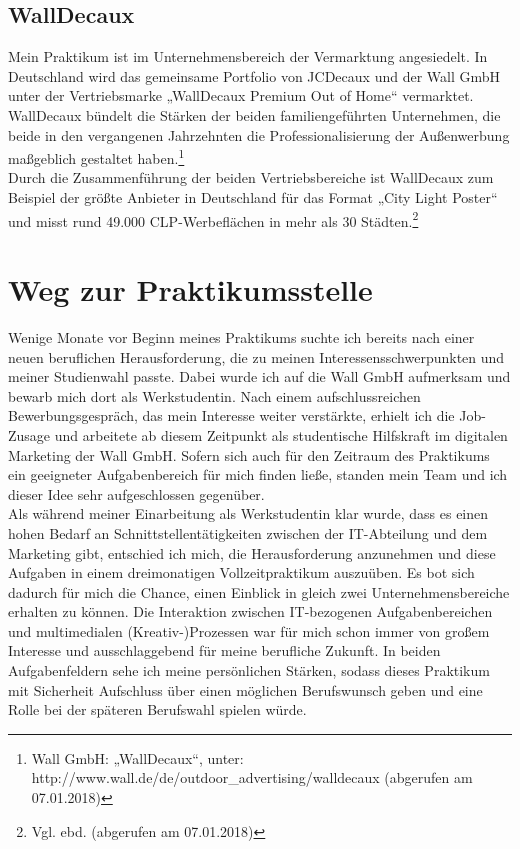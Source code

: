 \subsection{WallDecaux}\label{sec:walldecaux}
Mein Praktikum ist im Unternehmensbereich der Vermarktung angesiedelt. In Deutschland wird das gemeinsame Portfolio von JCDecaux und der Wall GmbH unter der Vertriebsmarke „WallDecaux Premium Out of Home“ vermarktet. WallDecaux bündelt die Stärken der beiden familiengeführten Unternehmen, die beide in den vergangenen Jahrzehnten die Professionalisierung der Außenwerbung maßgeblich gestaltet haben.\footnote{\label{foot:8}Wall GmbH: „WallDecaux“, unter: http://www.wall.de/de/outdoor\_advertising/walldecaux (abgerufen am 07.01.2018)} \\ Durch die Zusammenführung der beiden Vertriebsbereiche ist WallDecaux zum Beispiel der größte Anbieter in Deutschland für das Format „City Light Poster“ und misst rund 49.000 CLP-Werbeflächen in mehr als 30 Städten.\footnote{\label{foot:9}Vgl. ebd. (abgerufen am 07.01.2018)} 

\section{Weg zur Praktikumsstelle}\label{sec:wegzurstelle}
Wenige Monate vor Beginn meines Praktikums suchte ich bereits nach einer neuen beruflichen Herausforderung, die zu meinen Interessensschwerpunkten und meiner Studienwahl passte. Dabei wurde ich auf die Wall GmbH aufmerksam und bewarb mich dort als Werkstudentin. Nach einem aufschlussreichen Bewerbungsgespräch, das mein Interesse weiter verstärkte, erhielt ich die Job-Zusage und arbeitete ab diesem Zeitpunkt als studentische Hilfskraft im digitalen Marketing der Wall GmbH. Sofern sich auch für den Zeitraum des Praktikums ein geeigneter Aufgabenbereich für mich finden ließe, standen mein Team und ich dieser Idee sehr aufgeschlossen gegenüber. \\ Als während meiner Einarbeitung als Werkstudentin klar wurde, dass es einen hohen Bedarf an Schnittstellentätigkeiten zwischen der IT-Abteilung und dem Marketing gibt, entschied ich mich, die Herausforderung anzunehmen und diese Aufgaben in einem dreimonatigen Vollzeitpraktikum auszuüben. Es bot sich dadurch für mich die Chance, einen Einblick in gleich zwei Unternehmensbereiche erhalten zu können. Die Interaktion zwischen IT-bezogenen Aufgabenbereichen und multimedialen (Kreativ-)Prozessen war für mich schon immer von großem Interesse und ausschlaggebend für meine berufliche Zukunft. In beiden Aufgabenfeldern sehe ich meine persönlichen Stärken, sodass dieses Praktikum mit Sicherheit Aufschluss über einen möglichen Berufswunsch geben und eine Rolle bei der späteren Berufswahl spielen würde. 

\newpage